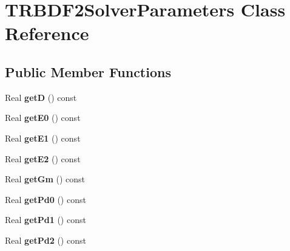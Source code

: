 \hypertarget{classTRBDF2SolverParameters}{
\section{TRBDF2SolverParameters Class Reference}
\label{classTRBDF2SolverParameters}
}
\subsection*{Public Member Functions}
\begin{DoxyCompactItemize}
\item 
\hypertarget{classTRBDF2SolverParameters_a6b8d26128e0d81ea1e2b1f8139744855}{
Real {\bfseries getD} () const }
\label{classTRBDF2SolverParameters_a6b8d26128e0d81ea1e2b1f8139744855}

\item 
\hypertarget{classTRBDF2SolverParameters_adc7b9fde1606291972f216093b436990}{
Real {\bfseries getE0} () const }
\label{classTRBDF2SolverParameters_adc7b9fde1606291972f216093b436990}

\item 
\hypertarget{classTRBDF2SolverParameters_abd9d6dcce2e1c788a6f24f98df3f438a}{
Real {\bfseries getE1} () const }
\label{classTRBDF2SolverParameters_abd9d6dcce2e1c788a6f24f98df3f438a}

\item 
\hypertarget{classTRBDF2SolverParameters_ab1d976394715dff2a66ae23404a465bf}{
Real {\bfseries getE2} () const }
\label{classTRBDF2SolverParameters_ab1d976394715dff2a66ae23404a465bf}

\item 
\hypertarget{classTRBDF2SolverParameters_a3e4bfd6d63d25c83656955185752186d}{
Real {\bfseries getGm} () const }
\label{classTRBDF2SolverParameters_a3e4bfd6d63d25c83656955185752186d}

\item 
\hypertarget{classTRBDF2SolverParameters_a7e3e230c6a5aa1a0c54e61ce8d6084bc}{
Real {\bfseries getPd0} () const }
\label{classTRBDF2SolverParameters_a7e3e230c6a5aa1a0c54e61ce8d6084bc}

\item 
\hypertarget{classTRBDF2SolverParameters_a99e4fc0ed2b76c38fe59e26261cf7f8a}{
Real {\bfseries getPd1} () const }
\label{classTRBDF2SolverParameters_a99e4fc0ed2b76c38fe59e26261cf7f8a}

\item 
\hypertarget{classTRBDF2SolverParameters_ada5e8684bb05b56ccecc61aceb85c4b8}{
Real {\bfseries getPd2} () const }
\label{classTRBDF2SolverParameters_ada5e8684bb05b56ccecc61aceb85c4b8}


\end{DoxyCompactItemize}
